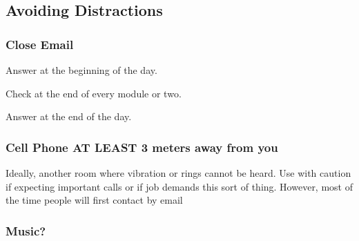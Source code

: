 \documentclass{book}
\begin{document}
\subsection{Avoiding Distractions}
\subsubsection{Close Email}
Answer at the beginning of the day.

Check at the end of every module or two.

Answer at the end of the day.
\subsubsection{Cell Phone AT LEAST 3 meters away from you}
Ideally, another room where vibration or rings cannot be heard. Use with caution if expecting important calls or if job demands this sort of thing. However, most of the time people will first contact by email


\subsubsection{{\color{orange}Music?}}
\end{document}
